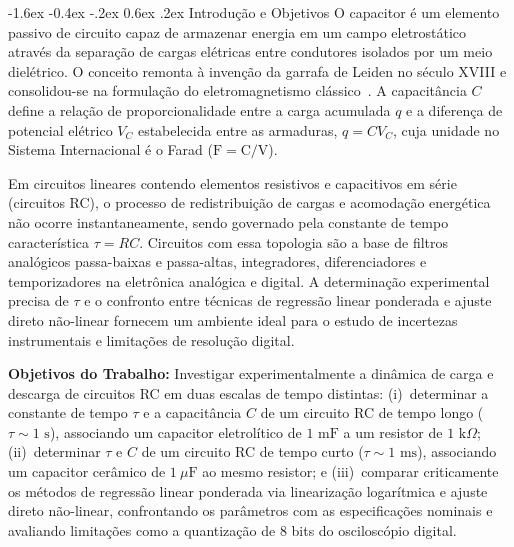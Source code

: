\documentclass[12pt, a4paper]{article}
\makeatletter
\renewcommand\section{\@startsection {section}{1}{\z@}%
                                   {-1.6ex \@plus -0.4ex \@minus -.2ex}%
                                   {0.6ex \@plus .2ex}%
                                   {\normalfont\large\bfseries}}
\makeatother
\begin{document}
\section{Introdução e Objetivos}
\vspace{-0.15cm}
O capacitor é um elemento passivo de circuito capaz de armazenar energia em um campo eletrostático através da separação de cargas elétricas entre condutores isolados por um meio dielétrico. O conceito remonta à invenção da garrafa de Leiden no século XVIII e consolidou-se na formulação do eletromagnetismo clássico~\cite{halliday}. A capacitância $C$ define a relação de proporcionalidade entre a carga acumulada $q$ e a diferença de potencial elétrico $V_C$ estabelecida entre as armaduras, $q = C V_C$, cuja unidade no Sistema Internacional é o Farad ($\text{F} = \text{C}/\text{V}$).

Em circuitos lineares contendo elementos resistivos e capacitivos em série (circuitos RC), o processo de redistribuição de cargas e acomodação energética não ocorre instantaneamente, sendo governado pela constante de tempo característica $\tau = R C$. Circuitos com essa topologia são a base de filtros analógicos passa-baixas e passa-altas, integradores, diferenciadores e temporizadores na eletrônica analógica e digital. A determinação experimental precisa de $\tau$ e o confronto entre técnicas de regressão linear ponderada e ajuste direto não-linear fornecem um ambiente ideal para o estudo de incertezas instrumentais e limitações de resolução digital.

\noindent\textbf{Objetivos do Trabalho:}
Investigar experimentalmente a dinâmica de carga e descarga de circuitos RC em duas escalas de tempo distintas: (i)~determinar a constante de tempo $\tau$ e a capacitância $C$ de um circuito RC de tempo longo ($\tau \sim 1\text{ s}$), associando um capacitor eletrolítico de $1\text{ mF}$ a um resistor de $1\text{ k}\Omega$; (ii)~determinar $\tau$ e $C$ de um circuito RC de tempo curto ($\tau \sim 1\text{ ms}$), associando um capacitor cerâmico de $1\ \mu\text{F}$ ao mesmo resistor; e (iii)~comparar criticamente os métodos de regressão linear ponderada via linearização logarítmica e ajuste direto não-linear, confrontando os parâmetros com as especificações nominais e avaliando limitações como a quantização de 8 bits do osciloscópio digital.

\vspace{-0.25cm}
\end{document}
